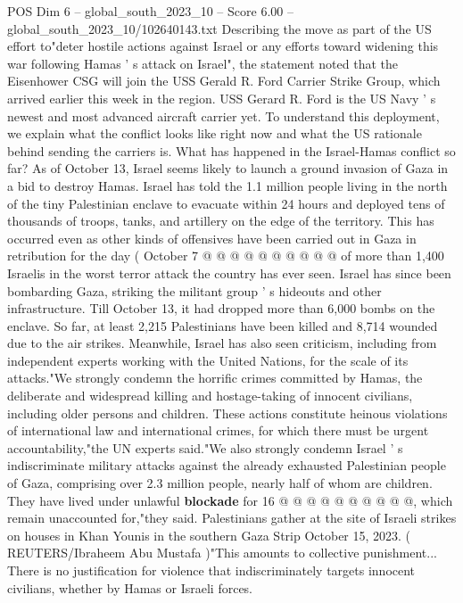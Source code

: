 \begin{textsample}{POS Dim 6 – global\_south\_2023\_10 – Score 6.00 – global\_south\_2023\_10/102640143.txt}  \label{ex:f6_pos_241}
Describing the move as part of the US effort to"deter hostile actions against Israel or any efforts toward widening this war following Hamas ' s attack on Israel", the statement noted that the Eisenhower CSG will join the USS Gerald R.
Ford Carrier Strike Group, which arrived earlier this week in the region.
USS Gerard R.
Ford is the US Navy ' s newest and most advanced aircraft carrier yet.
To understand this deployment, we explain what the conflict looks like right now and what the US rationale behind sending the carriers is.
What has happened in the Israel-Hamas conflict so far?
As of October 13, Israel seems likely to launch a ground invasion of Gaza in a bid to destroy Hamas.
Israel has told the 1.1 million people living in the north of the tiny Palestinian enclave to evacuate within 24 hours and deployed tens of thousands of troops, tanks, and artillery on the edge of the territory.
This has occurred even as other kinds of offensives have been carried out in Gaza in retribution for the day ( October 7 @ @ @ @ @ @ @ @ @ @ of more than 1,400 Israelis in the worst terror attack the country has ever seen.
Israel has since been bombarding Gaza, striking the militant group ' s hideouts and other infrastructure.
Till October 13, it had dropped more than 6,000 bombs on the enclave.
So far, at least 2,215 Palestinians have been killed and 8,714 wounded due to the air strikes.
Meanwhile, Israel has also seen criticism, including from independent experts working with the United Nations, for the scale of its attacks."We strongly condemn the horrific crimes committed by Hamas, the deliberate and widespread killing and hostage-taking of innocent civilians, including older persons and children.
These actions constitute heinous violations of international law and international crimes, for which there must be urgent accountability,"the UN experts said."We also strongly condemn Israel ' s indiscriminate military attacks against the already exhausted Palestinian people of Gaza, comprising over 2.3 million people, nearly half of whom are children.
They have lived under unlawful \textbf{blockade} for 16 @ @ @ @ @ @ @ @ @ @, which remain unaccounted for,"they said.
Palestinians gather at the site of Israeli strikes on houses in Khan Younis in the southern Gaza Strip October 15, 2023. ( REUTERS/Ibraheem Abu Mustafa )"This amounts to collective punishment...
There is no justification for violence that indiscriminately targets innocent civilians, whether by Hamas or Israeli forces.

\end{textsample}
